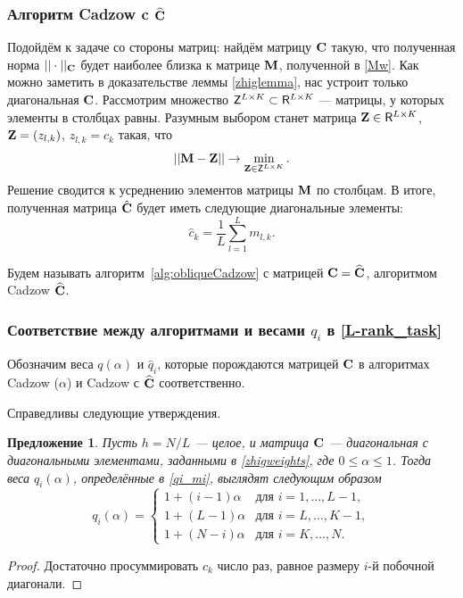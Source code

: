 \documentclass[12pt,a4paper,fleqn,leqno]{article}
\newtheorem{proposition}{Предложение}%
\begin{document}
\subsubsection{Алгоритм Cadzow c $\widehat{\mathbf{C}}$}
\label{sec:cadzow_hat}
Подойдём к задаче со стороны матриц: найдём матрицу $\mathbf{C}$ такую, что полученная норма $||\cdot||_{\mathbf{C}}$ будет наиболее близка к матрице $\mathbf{M}$, полученной в \eqref{Mw}. Как можно заметить в доказательстве леммы \ref{zhiglemma}, нас устроит только диагональная $\mathbf{C}$. Рассмотрим множество $\mathsf{Z}^{L \times K} \subset \mathsf{R}^{L \times K}$ --- матрицы, у которых элементы в столбцах равны. Разумным выбором станет матрица $\mathbf{Z} \in \mathsf{R}^{L \times K}$, $\mathbf{Z}=(z_{l,k})$, $z_{l,k} = c_k$ такая, что
\begin{equation*}
||\mathbf{M} - \mathbf{Z}|| \to \min_{\mathbf{Z} \in \mathsf{Z}^{L \times K}}.
\end{equation*}
Решение сводится к усреднению элементов матрицы $\mathbf{M}$ по столбцам. В итоге, полученная матрица $\hat {\mathbf{C}}$ будет иметь следующие диагональные элементы:
\begin{equation}\label{my_s}
\hat c_k = \frac{1}{L}\sum_{l=1}^L m_{l, k}.
\end{equation}

Будем называть алгоритм~\ref{alg:obliqueCadzow} с матрицей $\mathbf{C}=\widehat{\mathbf{C}}$, алгоритмом Cadzow $\widehat{\mathbf{C}}$.

\subsubsection{Соответствие между алгоритмами и весами $q_i$ в \eqref{L-rank_task}}

Обозначим веса $q(\alpha)$ и $\hat q_i$, которые порождаются матрицей $\mathbf{C}$ в алгоритмах Cadzow ($\alpha$) и Cadzow с $\widehat{\mathbf{C}}$ соответственно.

Справедливы следующие утверждения. 

\begin{proposition}\label{zhigconseq}
Пусть $h = N/L$ --- целое, и матрица $\mathbf{C}$ --- диагональная с диагональными элементами,
заданными в \eqref{zhigweights},
где $0 \le \alpha \le 1$. Тогда веса $q_i(\alpha)$, определённые в \eqref{qi_mi}, выглядят следующим образом
\begin{equation*}
q_i (\alpha) = \begin{cases}
1 + (i - 1) \alpha & \text{для $i = 1, \ldots, L-1,$}\\
1 + (L - 1) \alpha & \text{для $i = L, \ldots, K-1,$}\\
1 + (N - i) \alpha & \text{для $i = K, \ldots, N.$}
\end{cases}
\end{equation*}
\end{proposition}
\begin{proof}
Достаточно просуммировать $c_k$ число раз, равное размеру $i$-й побочной диагонали.
\end{proof}
\end{document}
